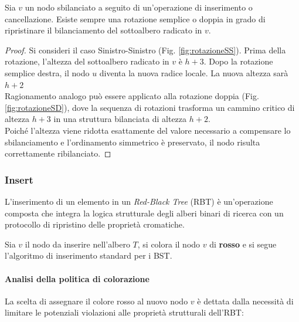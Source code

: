 \begin{lemma}
    Sia $v$ un nodo sbilanciato a seguito di un'operazione di inserimento o cancellazione. Esiste sempre una rotazione semplice o doppia in grado di ripristinare il bilanciamento del sottoalbero radicato in $v$.
\end{lemma}

\begin{proof}
    Si consideri il caso Sinistro-Sinistro (Fig. \ref{fig:rotazioneSS}). Prima della rotazione, l'altezza del sottoalbero radicato in $v$ è $h+3$. Dopo la rotazione semplice destra, il nodo $u$ diventa la nuova radice locale. La nuova altezza sarà $h+2$\\
    Ragionamento analogo può essere applicato alla rotazione doppia (Fig. \ref{fig:rotazioneSD}), dove la sequenza di rotazioni trasforma un cammino critico di altezza $h+3$ in una struttura bilanciata di altezza $h+2$. \\
    Poiché l'altezza viene ridotta esattamente del valore necessario a compensare lo sbilanciamento e l'ordinamento simmetrico è preservato, il nodo risulta correttamente ribilanciato.
\end{proof}

\subsubsection{Insert}

L'inserimento di un elemento in un \textit{Red-Black Tree} (RBT) è un'operazione composta che integra la logica strutturale degli alberi binari di ricerca con un protocollo di ripristino delle proprietà cromatiche.

Sia $v$ il nodo da inserire nell'albero $T$, si colora il nodo $v$ di \textbf{rosso} e si segue l'algoritmo di inserimento standard per i BST.

\paragraph{Analisi della politica di colorazione}
La scelta di assegnare il colore rosso al nuovo nodo $v$ è dettata dalla necessità di limitare le potenziali violazioni alle proprietà strutturali dell'RBT:

